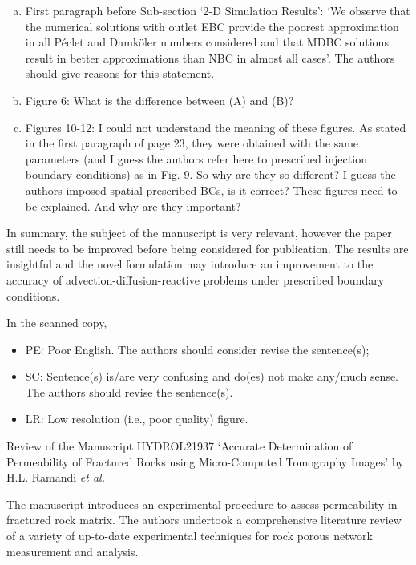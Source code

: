 \documentclass[14pt,twoside]{report}
\begin{document}
\begin{enumerate}[(a)]
%
\item First paragraph before Sub-section `2-D Simulation Results': `We observe that the numerical solutions with outlet EBC provide the poorest approximation in all P\'eclet and Damk\"oler numbers considered and that MDBC solutions result in better approximations than NBC in almost all cases'. The authors should give reasons for this statement.
%
\item Figure 6: What is the difference between (A) and (B)?
%
\item Figures 10-12:  I could not understand the meaning of these figures. As stated in the first paragraph of page 23, they were obtained with the same parameters (and I guess the authors refer here to prescribed injection boundary conditions) as in Fig. 9. So why are they so different? I guess the authors imposed spatial-prescribed BCs, is it correct? These figures need to be explained. And why are they important?
%
\end{enumerate}

In summary, the subject of the manuscript is very relevant, however the paper still needs to be improved before being considered for publication. The results are insightful and the novel formulation may introduce an improvement to the accuracy of advection-diffusion-reactive problems under prescribed boundary conditions. 


In the scanned copy,
\begin{itemize}
\item PE: Poor English. The authors should consider revise the sentence(s);
\item SC: Sentence(s) is/are very confusing and do(es) not make any/much sense. The authors should revise the sentence(s).
\item LR: Low resolution (i.e., poor quality) figure.
\end{itemize}


{
  }


\clearpage

\begin{center}
  {\Large Review of the Manuscript HYDROL21937 `Accurate Determination of Permeability of Fractured Rocks using Micro-Computed Tomography Images' by H.L. Ramandi {\it et al.}}
\end{center}

\medskip

The manuscript introduces an experimental procedure to assess permeability in fractured rock matrix. The authors undertook a comprehensive literature review of a variety of up-to-date experimental techniques for rock porous network measurement and analysis.
\end{document}
